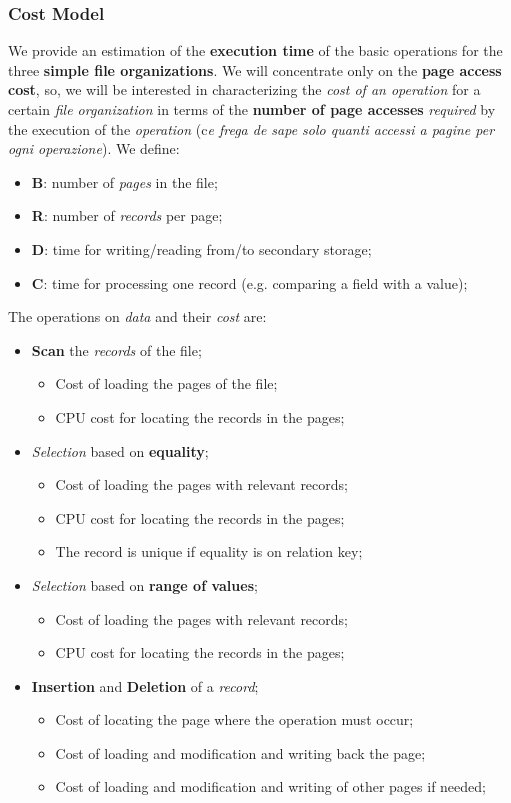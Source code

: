 \documentclass{article}
\begin{document}
\subsubsection{Cost Model}
We provide an estimation of the \textbf{execution time} of the basic operations for the three \textbf{simple file organizations}. We will concentrate only on the \textbf{page access cost}, so, we will be interested in characterizing the \emph{cost of an operation} for a certain \emph{file organization} in terms of the \textbf{number of page accesses} \emph{required} by the execution of the \emph{operation} (c\emph{e frega de sape solo quanti accessi a pagine per ogni operazione}). We define:
\begin{itemize}
\item \textbf{B}: number of \emph{pages} in the file;
\item \textbf{R}: number of \emph{records} per page;
\item \textbf{D}: time for writing/reading from/to secondary storage;
\item \textbf{C}: time for processing one record (e.g. comparing a field with a value);
\end{itemize}
The operations on \emph{data} and their \emph{cost} are:
\begin{itemize}
\item \textbf{Scan} the \emph{records} of the file;
\begin{itemize}
\item Cost of loading the pages of the file;
\item CPU cost for locating the records in the pages;
\end{itemize}
\item \emph{Selection} based on \textbf{equality};
\begin{itemize}
\item Cost of loading the pages with relevant records;
\item CPU cost for locating the records in the pages;
\item The record is unique if equality is on relation key;
\end{itemize}
\item \emph{Selection} based on \textbf{range of values};
\begin{itemize}
\item Cost of loading the pages with relevant records;
\item CPU cost for locating the records in the pages;
\end{itemize}
\item \textbf{Insertion} and \textbf{Deletion} of a \emph{record};
\begin{itemize}
\item Cost of locating the page where the operation must occur;
\item Cost of loading and modification and writing back the page;
\item Cost of loading and modification and writing of other pages if needed;
\end{itemize}
\end{itemize}
\end{document}
